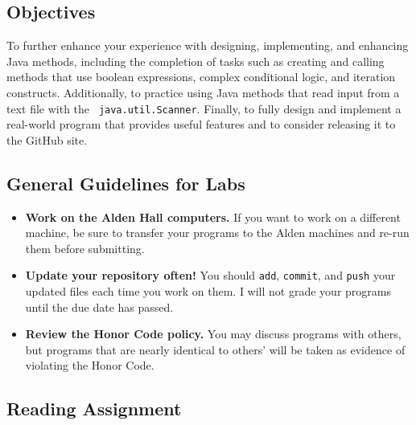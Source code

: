 


\vspace{-0.2in}
\subsection*{Objectives}
\vspace{-0.05in}

To further enhance your experience with designing, implementing, and enhancing Java methods, including the completion of
tasks such as creating and calling methods that use boolean expressions, complex conditional logic, and iteration
constructs.  Additionally, to practice using Java methods that read input from a text file with the {\tt
java.util.Scanner}. Finally, to fully design and implement a real-world program that provides useful features and to
consider releasing it to the GitHub site.

\vspace{-0.15in}
\subsection*{General Guidelines for Labs}
\vspace{-0.05in}

\begin{itemize}
\item
{\bf Work on the Alden Hall computers.} If you want to work on a different
machine, be sure to transfer your programs to the Alden
machines and re-run them before submitting.
\item
  {\bf Update your repository often!} You should {\tt add}, {\tt commit},
  and {\tt push} your updated files each time you work on them.  I will not grade
your programs until the due date has passed.
\item
{\bf Review the Honor Code policy.} You
may discuss programs with others, but programs that are nearly identical
to others' will be taken as evidence of violating the Honor Code.
\end{itemize}

\vspace{-0.25in}
\subsection*{Reading Assignment}
\vspace{-0.05in}

